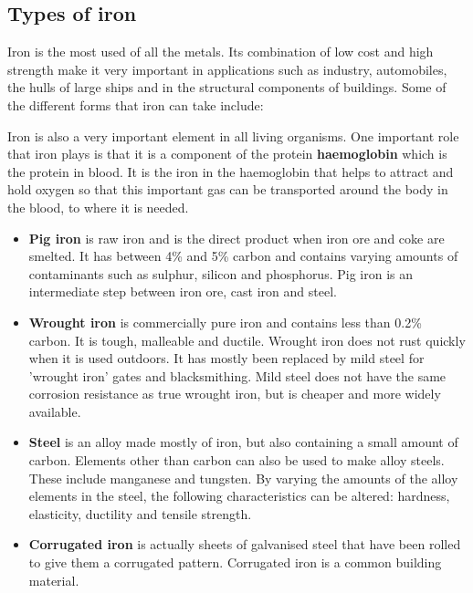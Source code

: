 \subsection{Types of iron}

Iron is the most used of all the metals. Its combination of low cost and high strength make it very important in applications such as industry, automobiles, the hulls of large ships and in the structural components of buildings. Some of the different forms that iron can take include:

\begin{IFact}{
Iron is also a very important element in all living organisms. One important role that iron plays is that it is a component of the protein \textbf{haemoglobin} which is the protein in blood. It is the iron in the haemoglobin that helps to attract and hold oxygen so that this important gas can be transported around the body in the blood, to where it is needed.
}
\end{IFact}

\begin{itemize}

\item{\textbf{Pig iron} is raw iron and is the direct product when iron ore and coke are smelted. It has between 4\% and 5\% carbon and contains varying amounts of contaminants such as sulphur, silicon and phosphorus. Pig iron is an intermediate step between iron ore, cast iron and steel.}

\item{\textbf{Wrought iron} is commercially pure iron and contains less than 0.2\% carbon. It is tough, malleable and ductile. Wrought iron does not rust quickly when it is used outdoors. It has mostly been replaced by mild steel for 'wrought iron' gates and blacksmithing. Mild steel does not have the same corrosion resistance as true wrought iron, but is cheaper and more widely available.}

\item{\textbf{Steel} is an alloy made mostly of iron, but also containing a small amount of carbon. Elements other than carbon can also be used to make alloy steels. These include manganese and tungsten. By varying the amounts of the alloy elements in the steel, the following characteristics can be altered: hardness, elasticity, ductility and tensile strength.
}

\item{\textbf{Corrugated iron} is actually sheets of galvanised steel that have been rolled to give them a corrugated pattern. Corrugated iron is a common building material.}
\end{itemize}

